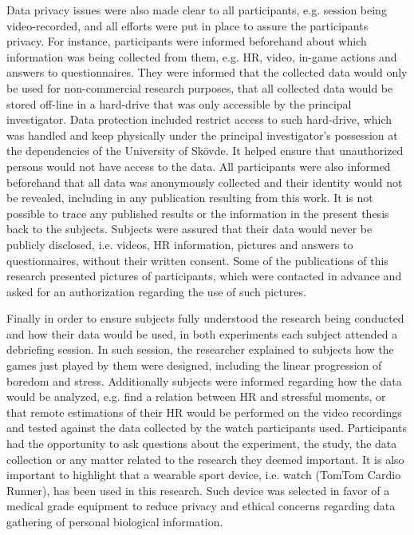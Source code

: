 Data privacy issues were also made clear to all participants, e.g. session being video-recorded, and all efforts were put in place to assure the participants privacy. For instance, participants were informed beforehand about which information was being collected from them, e.g. HR, video, in-game actions and answers to questionnaires. They were informed that the collected data would only be used for non-commercial research purposes, that all collected data would be stored off-line in a hard-drive that was only accessible by the principal investigator. Data protection included restrict access to such hard-drive, which was handled and keep physically under the principal investigator's possession at the dependencies of the University of Sk\"ovde. It helped ensure that unauthorized persons would not have access to the data. All participants were also informed beforehand that all data was anonymously collected and their identity would not be revealed, including in any publication resulting from this work. It is not possible to trace any published results or the information in the present thesis back to the subjects. Subjects were assured that their data would never be publicly disclosed, i.e. videos, HR information, pictures and answers to questionnaires, without their written consent. Some of the publications of this research presented pictures of participants, which were contacted in advance and asked for an authorization regarding the use of such pictures.

Finally in order to ensure subjects fully understood the research being conducted and how their data would be used, in both experiments each subject attended a debriefing session. In such session, the researcher explained to subjects how the games just played by them were designed, including the linear progression of boredom and stress. Additionally subjects were informed regarding how the data would be analyzed, e.g. find a relation between HR and stressful moments, or that remote estimations of their HR would be performed on the video recordings and tested against the data collected by the watch participants used. Participants had the opportunity to ask questions about the experiment, the study, the data collection or any matter related to the research they deemed important. It is also important to highlight that a wearable sport device, i.e. watch (TomTom Cardio Runner), has been used in this research. Such device was selected in favor of a medical grade equipment to reduce privacy and ethical concerns regarding data gathering of personal biological information.

